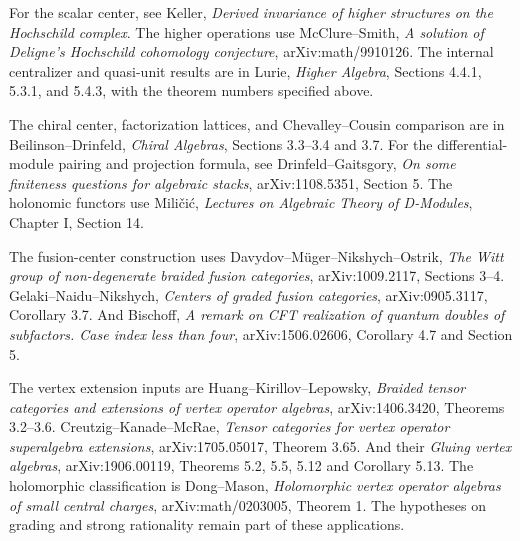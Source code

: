 For the scalar center, see Keller,
\emph{Derived invariance of higher structures on the
Hochschild complex}. The higher operations use McClure--Smith,
\emph{A solution of Deligne's Hochschild cohomology conjecture},
arXiv:math/9910126.
The internal centralizer and quasi-unit results are in
Lurie, \emph{Higher Algebra}, Sections 4.4.1, 5.3.1,
and 5.4.3, with the theorem numbers specified above.

The chiral center, factorization lattices, and
Chevalley--Cousin comparison are in
Beilinson--Drinfeld, \emph{Chiral Algebras},
Sections 3.3--3.4 and 3.7.
For the differential-module pairing and projection formula,
see Drinfeld--Gaitsgory, \emph{On some finiteness questions
for algebraic stacks}, arXiv:1108.5351, Section 5.
The holonomic functors use Mili\v{c}i\'c,
\emph{Lectures on Algebraic Theory of D-Modules},
Chapter I, Section 14.

The fusion-center construction uses
Davydov--M\"uger--Nikshych--Ostrik,
\emph{The Witt group of non-degenerate braided fusion
categories}, arXiv:1009.2117, Sections 3--4.
Gelaki--Naidu--Nikshych,
\emph{Centers of graded fusion categories},
arXiv:0905.3117, Corollary 3.7. And Bischoff,
\emph{A remark on CFT realization of quantum doubles
of subfactors. Case index less than four},
arXiv:1506.02606, Corollary 4.7 and Section 5.

The vertex extension inputs are Huang--Kirillov--Lepowsky,
\emph{Braided tensor categories and extensions of vertex
operator algebras}, arXiv:1406.3420, Theorems 3.2--3.6.
Creutzig--Kanade--McRae,
\emph{Tensor categories for vertex operator superalgebra
extensions}, arXiv:1705.05017, Theorem 3.65. And their
\emph{Gluing vertex algebras}, arXiv:1906.00119,
Theorems 5.2, 5.5, 5.12 and Corollary 5.13.
The holomorphic classification is Dong--Mason,
\emph{Holomorphic vertex operator algebras of small
central charges}, arXiv:math/0203005, Theorem 1.
The hypotheses on grading and strong rationality remain
part of these applications.
